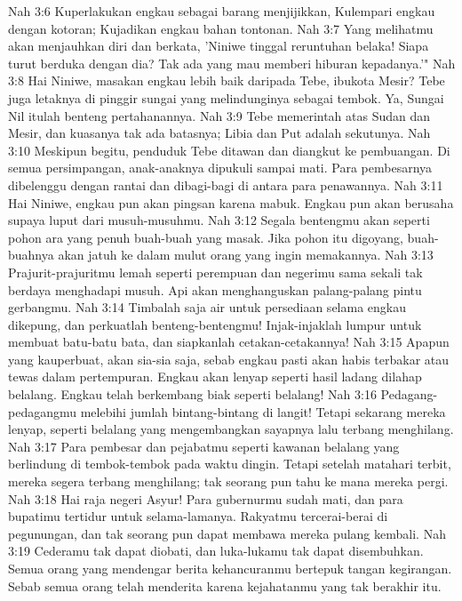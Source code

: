 Nah 3:6  Kuperlakukan engkau sebagai barang menjijikkan, Kulempari engkau dengan kotoran; Kujadikan engkau bahan tontonan.
Nah 3:7  Yang melihatmu akan menjauhkan diri dan berkata, 'Niniwe tinggal reruntuhan belaka! Siapa turut berduka dengan dia? Tak ada yang mau memberi hiburan kepadanya.'"
Nah 3:8  Hai Niniwe, masakan engkau lebih baik daripada Tebe, ibukota Mesir? Tebe juga letaknya di pinggir sungai yang melindunginya sebagai tembok. Ya, Sungai Nil itulah benteng pertahanannya.
Nah 3:9  Tebe memerintah atas Sudan dan Mesir, dan kuasanya tak ada batasnya; Libia dan Put adalah sekutunya.
Nah 3:10  Meskipun begitu, penduduk Tebe ditawan dan diangkut ke pembuangan. Di semua persimpangan, anak-anaknya dipukuli sampai mati. Para pembesarnya dibelenggu dengan rantai dan dibagi-bagi di antara para penawannya.
Nah 3:11  Hai Niniwe, engkau pun akan pingsan karena mabuk. Engkau pun akan berusaha supaya luput dari musuh-musuhmu.
Nah 3:12  Segala bentengmu akan seperti pohon ara yang penuh buah-buah yang masak. Jika pohon itu digoyang, buah-buahnya akan jatuh ke dalam mulut orang yang ingin memakannya.
Nah 3:13  Prajurit-prajuritmu lemah seperti perempuan dan negerimu sama sekali tak berdaya menghadapi musuh. Api akan menghanguskan palang-palang pintu gerbangmu.
Nah 3:14  Timbalah saja air untuk persediaan selama engkau dikepung, dan perkuatlah benteng-bentengmu! Injak-injaklah lumpur untuk membuat batu-batu bata, dan siapkanlah cetakan-cetakannya!
Nah 3:15  Apapun yang kauperbuat, akan sia-sia saja, sebab engkau pasti akan habis terbakar atau tewas dalam pertempuran. Engkau akan lenyap seperti hasil ladang dilahap belalang. Engkau telah berkembang biak seperti belalang!
Nah 3:16  Pedagang-pedagangmu melebihi jumlah bintang-bintang di langit! Tetapi sekarang mereka lenyap, seperti belalang yang mengembangkan sayapnya lalu terbang menghilang.
Nah 3:17  Para pembesar dan pejabatmu seperti kawanan belalang yang berlindung di tembok-tembok pada waktu dingin. Tetapi setelah matahari terbit, mereka segera terbang menghilang; tak seorang pun tahu ke mana mereka pergi.
Nah 3:18  Hai raja negeri Asyur! Para gubernurmu sudah mati, dan para bupatimu tertidur untuk selama-lamanya. Rakyatmu tercerai-berai di pegunungan, dan tak seorang pun dapat membawa mereka pulang kembali.
Nah 3:19  Cederamu tak dapat diobati, dan luka-lukamu tak dapat disembuhkan. Semua orang yang mendengar berita kehancuranmu bertepuk tangan kegirangan. Sebab semua orang telah menderita karena kejahatanmu yang tak berakhir itu.


